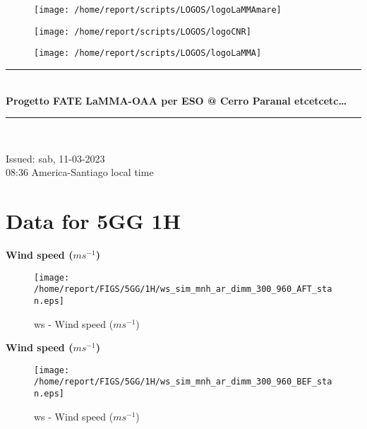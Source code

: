 \documentclass[11pt,english]{article}
\newcommand{\HRule}{\rule{\linewidth}{0.5mm}}
\begin{document}
\begin{figure}
\begin{center}
\hspace{.5cm}
\parbox{5.5cm}{\texttt{[image: /home/report/scripts/LOGOS/logoLaMMAmare]}}
\hspace{.5cm}
\parbox{5.5cm}{\texttt{[image: /home/report/scripts/LOGOS/logoCNR]}}
\hspace{.5cm}
\parbox{5.5cm}{\texttt{[image: /home/report/scripts/LOGOS/logoLaMMA]}}
\hspace{.1cm}
\vspace{1.2cm}
\end{center}
\end{figure}

\begin{center}
\HRule \\[0.4cm]
\Huge{\textbf{Progetto FATE LaMMA-OAA per ESO @ Cerro Paranal etcetcetc\ldots}}
\HRule \\[0.4cm]
\end{center}

\begin{center}
\vspace{2cm}\Huge{Issued: sab, 11-03-2023\\ 08:36 America-Santiago local time}
\end{center}


\clearpage
\section{Data for 5GG 1H}
\newpage

\begin{center}
\textbf{Wind speed ($m s^{-1}$)}
\end{center}

\begin{figure}[htbp]
\centering
{\texttt{[image: /home/report/FIGS/5GG/1H/ws\_sim\_mnh\_ar\_dimm\_300\_960\_AFT\_stan.eps]}}
\caption{ws - Wind speed ($m s^{-1}$)}\label{fig:ws1}
\end{figure}
\newpage

\begin{center}
\textbf{Wind speed ($m s^{-1}$)}
\end{center}

\begin{figure}[htbp]
\centering
{\texttt{[image: /home/report/FIGS/5GG/1H/ws\_sim\_mnh\_ar\_dimm\_300\_960\_BEF\_stan.eps]}}
\caption{ws - Wind speed ($m s^{-1}$)}\label{fig:ws2}
\end{figure}
\newpage
\end{document}
